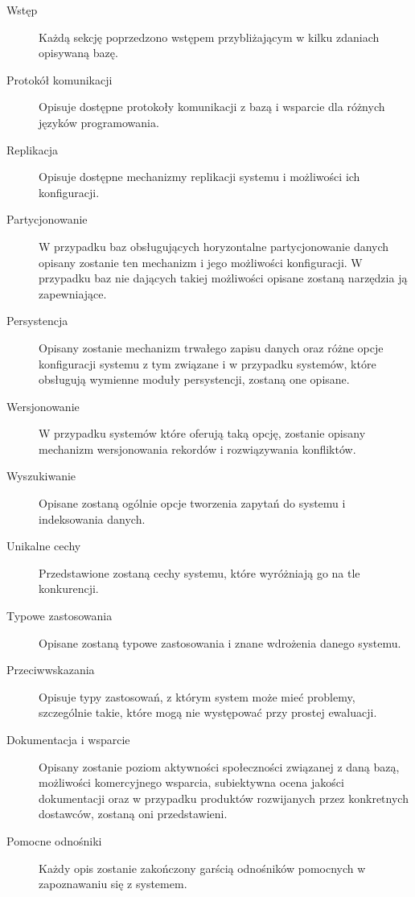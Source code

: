 \begin{description}
 \item[Wstęp] 
 Każdą sekcję poprzedzono wstępem przybliżającym w kilku zdaniach opisywaną bazę. 
 
 \item[Protokół komunikacji]
 Opisuje dostępne protokoły komunikacji z bazą i wsparcie dla różnych języków programowania.

 \item[Replikacja]
 Opisuje dostępne mechanizmy replikacji systemu i możliwości ich konfiguracji.

 \item[Partycjonowanie]
 W przypadku baz obsługujących horyzontalne partycjonowanie danych opisany zostanie ten mechanizm i jego możliwości konfiguracji.
 W przypadku baz nie dających takiej możliwości opisane zostaną narzędzia ją zapewniające.

 \item[Persystencja]
 Opisany zostanie mechanizm trwałego zapisu danych oraz różne opcje konfiguracji systemu z tym związane i w przypadku systemów, które obsługują wymienne moduły persystencji, zostaną one opisane.

 \item[Wersjonowanie]
 W przypadku systemów które oferują taką opcję, zostanie opisany mechanizm wersjonowania rekordów i rozwiązywania konfliktów.

 \item[Wyszukiwanie]
 Opisane zostaną ogólnie opcje tworzenia zapytań do systemu i indeksowania danych.

 \item[Unikalne cechy]
 Przedstawione zostaną cechy systemu, które wyróżniają go na tle konkurencji.

 \item[Typowe zastosowania]
 Opisane zostaną typowe zastosowania i znane wdrożenia danego systemu.

 \item[Przeciwwskazania]
 Opisuje typy zastosowań, z którym system może mieć problemy, szczególnie takie, które mogą nie występować przy prostej ewaluacji.

 \item[Dokumentacja i wsparcie]
 Opisany zostanie poziom aktywności społeczności związanej z daną bazą, możliwości komercyjnego wsparcia, subiektywna ocena jakości dokumentacji oraz w przypadku produktów rozwijanych przez konkretnych dostawców, zostaną oni przedstawieni.

 \item[Pomocne odnośniki]
 Każdy opis zostanie zakończony garścią odnośników pomocnych w zapoznawaniu się z systemem.

\end{description} 